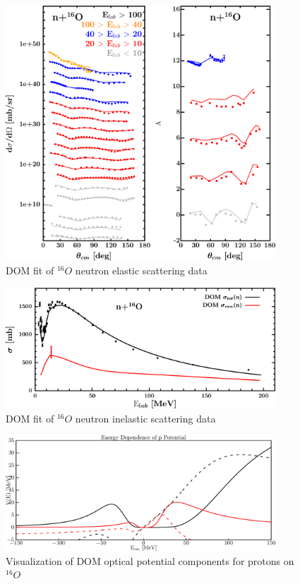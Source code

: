\begin{figure}
\begin{center}
\includegraphics[width = 0.9\textwidth]{figures/o16_neutronElastic.png}
\caption{DOM fit of $^{16}O$ neutron elastic scattering data}
\label{o16NeutronElastic}
\end{center}
\end{figure}

\begin{figure}
\begin{center}
\includegraphics[width = 0.9\textwidth]{figures/o16_neutronInelastic.png}
\caption{DOM fit of $^{16}O$ neutron inelastic scattering data}
\label{o16NeutronInelastic}
\end{center}
\end{figure}

\begin{figure}
\begin{center}
\includegraphics[width = 0.9\textwidth]{figures/o16_protonPotentials.png}
\caption{Visualization of DOM optical potential components for protons on
$^{16}O$}
\label{o16ProtonPotentials}
\end{center}
\end{figure}

